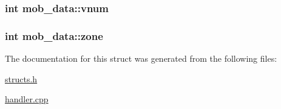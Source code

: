\hypertarget{structmob__data_a7803adf80bb5d19a5cf16f226c7937c9}{
\subsubsection[{vnum}]{\setlength{\rightskip}{0pt plus 5cm}int mob\-\_\-data\-::vnum}}\label{structmob__data_a7803adf80bb5d19a5cf16f226c7937c9}
\hypertarget{structmob__data_a6c0272e45a40961b383f3913fb76bcb2}{
\subsubsection[{zone}]{\setlength{\rightskip}{0pt plus 5cm}int mob\-\_\-data\-::zone}}\label{structmob__data_a6c0272e45a40961b383f3913fb76bcb2}


The documentation for this struct was generated from the following files\-:\begin{DoxyCompactItemize}
\item 
\hyperlink{structs_8h}{structs.\-h}\item 
\hyperlink{handler_8cpp}{handler.\-cpp}\end{DoxyCompactItemize}
